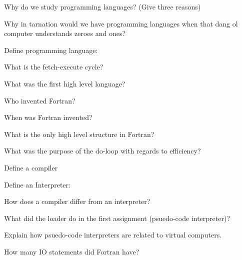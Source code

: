 \documentclass{exam} %
\begin{document}
\begin{questions}

  \question Why do we study programming languages? (Give three reasons)

  \question Why in tarnation would we have programming languages when that dang ol computer understands zeroes and ones?

  \question Define programming language:

  \question What is the fetch-execute cycle?

  \question What was the first high level language?

  \question Who invented Fortran?

  \question When was Fortran invented?

  \question What is the only high level structure in Fortran?

  \question What was the purpose of the do-loop with regards to efficiency?

  \question Define a compiler

  \pagebreak

  \question Define an Interpreter:

  \question How does a compiler differ from an interpreter?

  \question What did the loader do in the first assignment (psuedo-code interpreter)?

  \question Explain how psuedo-code interpreters are related to virtual computers.

  \question How many IO statements did Fortran have?


\end{questions}
\end{document}

